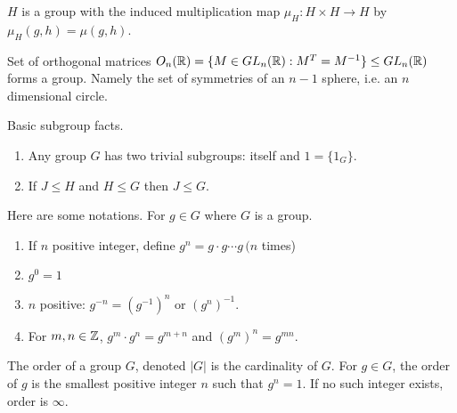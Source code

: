 \begin{proposition}
    \(H\) is a group with the induced multiplication map \(\mu_H: H \times H \to H\) by \(\mu_H(g, h) = \mu(g, h)\).
\end{proposition}

\begin{proposition}
    Set of orthogonal matrices \(O_n(\mathbb{R}) = \{M \in GL_n(\mathbb{R}) : M^T = M^{-1}\} \leq GL_n(\mathbb{R})\) forms a group. Namely the set of symmetries of an \(n - 1\) sphere, i.e. an \(n\) dimensional circle.
\end{proposition}

\begin{proposition}
    Basic subgroup facts.
    \begin{enumerate}
        \item Any group \(G\) has two trivial subgroups: itself and \(1 = \{1_G\}\).
        \item If \(J \leq H\) and \(H \leq G\) then \(J \leq G\).
    \end{enumerate}
\end{proposition}

Here are some notations. For \(g \in G\)  where \(G\) is a group.
\begin{enumerate}
    \item If \(n\) positive integer, define \(g^n = g \cdot g \cdots g \, (n\) times)
    \item \(g^0 = 1\)
    \item \(n\) positive: \(g^{-n} = (g^{-1})^n\) or \((g^n)^{-1}\).
    \item For \(m, n \in \mathbb{Z}\), \(g^m \cdot g^n = g^{m + n}\) and \((g^m)^n = g^{mn}\).
\end{enumerate}

\begin{definition}
    The order of a group \(G\), denoted \(|G|\) is the cardinality of \(G\). For \(g \in G\), the order of \(g\) is the smallest positive integer \(n\) such that \(g^n = 1\). If no such integer exists, order is \(\infty\).
\end{definition}
